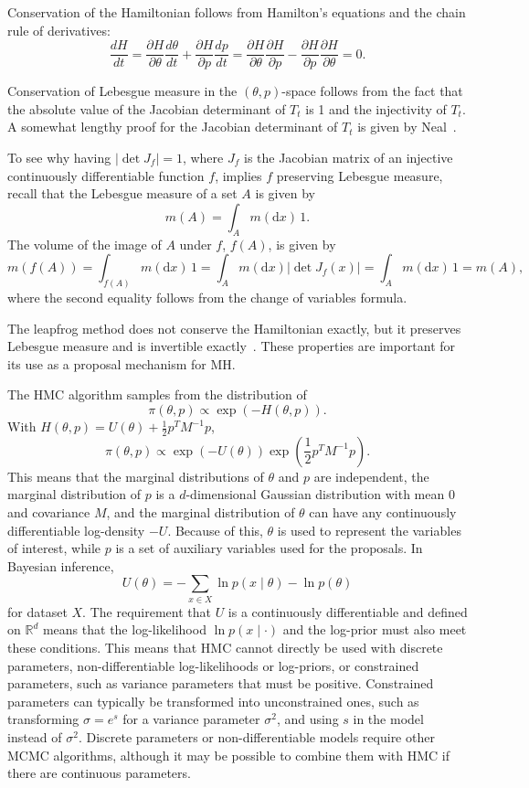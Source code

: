\documentclass[english,twoside,openright]{HYgraduMLDS}
\newcommand{\R}{\mathbb{R}}
\newcommand{\dx}{\mathrm{d}}
\begin{document}
Conservation of the Hamiltonian follows from Hamilton's equations and the 
chain rule of derivatives:
\[
    \frac{dH}{dt} = \frac{\partial H}{\partial \theta}\frac{d \theta}{dt}
    + \frac{\partial H}{\partial p}\frac{dp}{dt}
    = \frac{\partial H}{\partial \theta}\frac{\partial H}{\partial p}
    - \frac{\partial H}{\partial p}\frac{\partial H}{\partial \theta}
    = 0.
\]

Conservation of Lebesgue measure in the \((\theta, p)\)-space follows
from the fact that 
the absolute value of the Jacobian determinant of \(T_t\) is 1 and the 
injectivity of \(T_t\). A somewhat 
lengthy proof for the Jacobian determinant of \(T_t\) is given by
Neal~\cite{neal2012mcmc}. 

To see why 
having \(|\det J_f| = 1\), where \(J_f\) is the Jacobian matrix of an injective 
continuously differentiable function \(f\), 
implies \(f\) preserving Lebesgue measure, recall that the Lebesgue measure of a set
\(A\) is given by 
\[
    m(A) = \int_A m(\dx x)\, 1.
\]
The volume of the image of \(A\) under \(f\), \(f(A)\), is given by
\[
  m(f(A)) = \int_{f(A)}m(\dx x)\,1
  = \int_{A}m(\dx x)|\det J_f(x)| = \int_A m(\dx x)\,1
  = m(A),
\]
where the second equality follows from the change of variables formula.

The leapfrog method does not conserve the Hamiltonian exactly, but it 
preserves Lebesgue measure and is invertible exactly~\cite{neal2012mcmc}.
These properties are important for its use as a proposal mechanism for MH.

The HMC algorithm samples from the distribution of~\cite{neal2012mcmc}
\[
    \pi(\theta, p) \propto \exp(-H(\theta, p)).
\]
With \(H(\theta, p) = U(\theta) + \frac{1}{2}p^{T}M^{-1}p\),
\[
    \pi(\theta, p) \propto \exp(-U(\theta))\exp\left(\frac{1}{2}p^{T}M^{-1}p\right).
\]
This means that the marginal distributions of \(\theta\) and \(p\) are 
independent, the marginal distribution of \(p\) is a \(d\)-dimensional
Gaussian distribution 
with mean 0 and covariance \(M\), and the marginal distribution of
\(\theta\) can have any continuously differentiable log-density \(-U\).
Because of this, \(\theta\) is used to represent the variables of interest,
while \(p\) is a set of auxiliary variables used for the proposals.
In Bayesian inference,
\[
  U(\theta) = -\sum_{x\in X}\ln p(x\mid \theta) - \ln p(\theta)
\]
for dataset \(X\). The requirement that \(U\) is a continuously differentiable
and defined on \(\R^{d}\) means that the log-likelihood \(\ln p(x\mid \cdot)\)
and the log-prior must also meet these conditions. This means that HMC cannot directly
be used with discrete parameters, non-differentiable log-likelihoods or log-priors,
or constrained parameters, such as variance
parameters that must be positive. Constrained parameters can typically be
transformed into unconstrained ones, such as transforming \(\sigma = e^{s}\)
for a variance parameter \(\sigma^{2}\), and using \(s\) in the model instead
of \(\sigma^{2}\). Discrete parameters or non-differentiable models
require other MCMC algorithms, although it may be possible to combine them
with HMC if there are continuous parameters.
\end{document}
